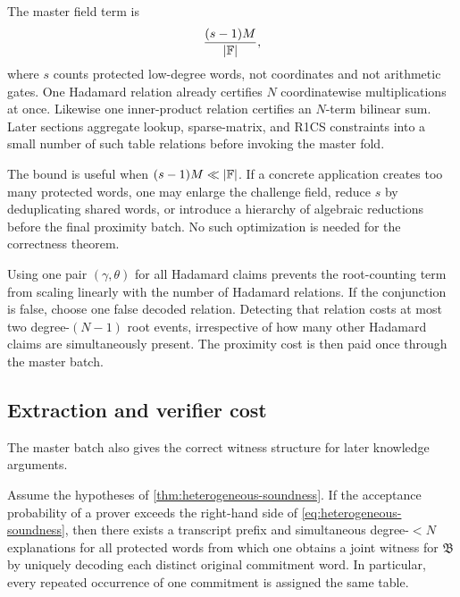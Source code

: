 \begin{remark}
\label{rem:heterogeneous-field-term}
The master field term is
\[
  \frac{(s-1)M}{|\mathbb{F}|},
\]
where $s$ counts protected low-degree words, not coordinates and not arithmetic gates.  One Hadamard relation already certifies $N$ coordinatewise multiplications at once.  Likewise one inner-product relation certifies an $N$-term bilinear sum.  Later sections aggregate lookup, sparse-matrix, and R1CS constraints into a small number of such table relations before invoking the master fold.

The bound is useful when $(s-1)M\ll|\mathbb{F}|$.  If a concrete application creates too many protected words, one may enlarge the challenge field, reduce $s$ by deduplicating shared words, or introduce a hierarchy of algebraic reductions before the final proximity batch.  No such optimization is needed for the correctness theorem.
\end{remark}

\begin{remark}
\label{rem:shared-had-challenges}
Using one pair $(\gamma,\theta)$ for all Hadamard claims prevents the root-counting term from scaling linearly with the number of Hadamard relations.  If the conjunction is false, choose one false decoded relation.  Detecting that relation costs at most two degree-$(N-1)$ root events, irrespective of how many other Hadamard claims are simultaneously present.  The proximity cost is then paid once through the master batch.
\end{remark}

\subsection{Extraction and verifier cost}
\label{sec:heterogeneous-extraction-cost}

The master batch also gives the correct witness structure for later knowledge arguments.

\begin{corollary}
\label{cor:heterogeneous-extraction}
Assume the hypotheses of \cref{thm:heterogeneous-soundness}.  If the acceptance probability of a prover exceeds the right-hand side of \eqref{eq:heterogeneous-soundness}, then there exists a transcript prefix and simultaneous degree-$<N$ explanations for all protected words from which one obtains a joint witness for $\mathfrak B$ by uniquely decoding each distinct original commitment word.  In particular, every repeated occurrence of one commitment is assigned the same table.
\end{corollary}

